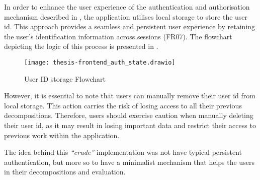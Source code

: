 In order to enhance the user experience of the authentication and authorisation
mechanism described in , the application utilises local
storage to store the user id. This approach provides a seamless and persistent
user experience by retaining the user's identification information across
sessions (FR07). The flowchart depicting the logic of this process is presented
in .

\begin{figure*}[!htb]
  \caption{User ID storage Flowchart}
  \label{fig:frontend_auth_state}
  \centering
  \texttt{[image: thesis-frontend\_auth\_state.drawio]}
\end{figure*}

However, it is essential to note that users can manually remove their user id
from local storage. This action carries the risk of losing access to all their
previous decompositions. Therefore, users should exercise caution when manually
deleting their user id, as it may result in losing important data and restrict
their access to previous work within the application.

The idea behind this \textit{``crude''} implementation was not have typical
persistent authentication, but more so to have a minimalist mechanism that
helps the users in their decompositions and evaluation.
